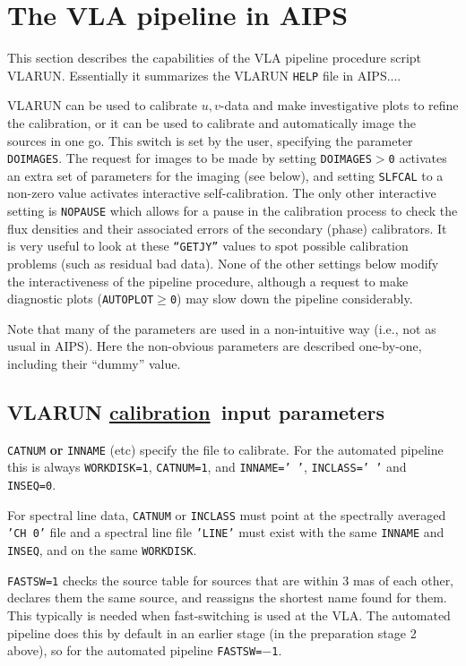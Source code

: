 \section{The VLA pipeline in AIPS}
This section describes the capabilities of the VLA pipeline procedure
script VLARUN. Essentially it summarizes the VLARUN {\tt HELP} file in
AIPS....

VLARUN can be used to calibrate $u,v$-data and make investigative plots
to refine the calibration, or it can be used to calibrate and
automatically image the sources in one go. This switch is set by the
user, specifying the parameter {\tt DOIMAGES}. The request for images to
be made by setting {\tt DOIMAGES$>$0} activates an extra set of
parameters for the imaging (see below), and setting {\tt SLFCAL} to a
non-zero value activates interactive self-calibration. The only other
interactive setting is {\tt NOPAUSE} which allows for a pause in the
calibration process to check the flux densities and their associated
errors of the secondary (phase) calibrators. It is very useful to look
at these {\tt ``GETJY''} values to spot possible calibration problems
(such as residual bad data). None of the other settings below modify
the interactiveness of the pipeline procedure, although a request to
make diagnostic plots ({\tt AUTOPLOT$\ge$0}) may slow down the pipeline
considerably.

Note that many of the parameters are used in a non-intuitive way
(i.e., not as usual in AIPS). Here the non-obvious parameters are
described one-by-one, including their ``dummy'' value.

\subsection{VLARUN \underline{calibration}\ input parameters}
{\tt CATNUM} {\bfseries or} {\tt INNAME} (etc) specify the file to
calibrate. For the automated pipeline this is always {\tt WORKDISK=1},
{\tt CATNUM=1}, and {\tt INNAME='~'}, {\tt INCLASS='~'} and {\tt
INSEQ=0}.

For spectral line data, {\tt CATNUM} or {\tt INCLASS} must point at
the spectrally averaged {\tt 'CH 0'} file and a spectral line file
{\tt 'LINE'} must exist with the same {\tt INNAME} and {\tt INSEQ},
and on the same {\tt WORKDISK}.

{\tt FASTSW=1} checks the source table for sources that are within 3
mas of each other, declares them the same source, and reassigns the
shortest name found for them. This typically is needed when
fast-switching is used at the VLA. The automated pipeline does this by
default in an earlier stage (in the preparation stage 2 above), so for
the automated pipeline {\tt FASTSW=$-$1}.

